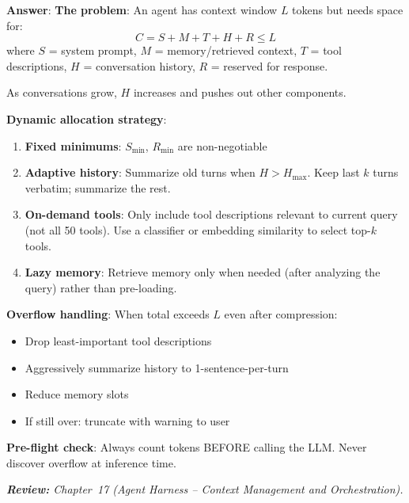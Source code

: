 \begin{questionbox}
\textbf{Answer}: \textbf{The problem}: An agent has context window $L$ tokens but needs space for: 
\[
C = S + M + T + H + R \leq L
\]
 where $S$ = system prompt, $M$ = memory/retrieved context, $T$ = tool descriptions, $H$ = conversation history, $R$ = reserved for response.

As conversations grow, $H$ increases and pushes out other components.

\textbf{Dynamic allocation strategy}:

\begin{enumerate}
  \item \textbf{Fixed minimums}: $S_{\min}$, $R_{\min}$ are non-negotiable
  \item \textbf{Adaptive history}: Summarize old turns when $H > H_{\max}$. Keep last $k$ turns verbatim; summarize the rest.
  \item \textbf{On-demand tools}: Only include tool descriptions relevant to current query (not all 50 tools). Use a classifier or embedding similarity to select top-$k$ tools.
  \item \textbf{Lazy memory}: Retrieve memory only when needed (after analyzing the query) rather than pre-loading.
\end{enumerate}

\textbf{Overflow handling}: When total exceeds $L$ even after compression:

\begin{itemize}
  \item Drop least-important tool descriptions
  \item Aggressively summarize history to 1-sentence-per-turn
  \item Reduce memory slots
  \item If still over: truncate with warning to user
\end{itemize}

\textbf{Pre-flight check}: Always count tokens BEFORE calling the LLM. Never discover overflow at inference time.

\emph{\textbf{Review:} Chapter~17 (Agent Harness -- Context Management and Orchestration).}
\end{questionbox}

